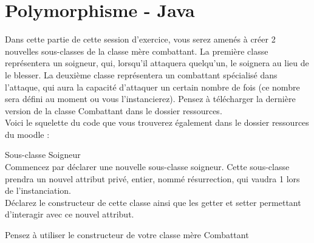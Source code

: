 \section{Polymorphisme - Java}

Dans cette partie de cette session d'exercice, vous serez amenés à créer 2 nouvelles sous-classes de la classe mère combattant. La première classe représentera un soigneur, qui, lorsqu'il attaquera quelqu'un, le soignera au lieu de le blesser. La deuxième classe représentera un combattant spécialisé dans l'attaque, qui aura la capacité d'attaquer un certain nombre de fois (ce nombre sera défini au moment ou vous l'instancierez). Pensez à télécharger la dernière version de la classe Combattant dans le dossier ressources.\\

Voici le squelette du code que vous trouverez également dans le dossier ressources du moodle : \\



\begin{Exercice}[5 minutes] Sous-classe Soigneur \\

Commencez par déclarer une nouvelle sous-classe soigneur. Cette sous-classe prendra un nouvel attribut privé, entier, nommé résurrection, qui vaudra 1 lors de l'instanciation. \\

Déclarez le constructeur de cette classe ainsi que les getter et setter permettant d'interagir avec ce nouvel attribut. \\

\begin{conseil}
Pensez à utiliser le constructeur de votre classe mère Combattant
\end{conseil}

\begin{solution}
	
\end{solution}

\end{Exercice}

